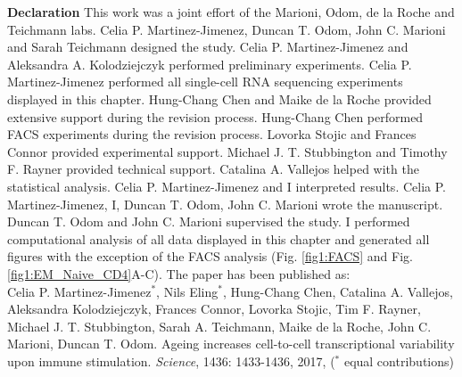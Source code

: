 \begin{Comment}
\textbf{Declaration} This work was a joint effort of the Marioni, Odom, de la Roche and Teichmann labs. Celia P. Martinez-Jimenez, Duncan T. Odom, John C. Marioni and Sarah Teichmann designed the study. Celia P. Martinez-Jimenez and Aleksandra A. Kolodziejczyk performed preliminary experiments. Celia P. Martinez-Jimenez performed all single-cell RNA sequencing experiments displayed in this chapter. Hung-Chang Chen and Maike de la Roche provided extensive support during the revision process. Hung-Chang Chen performed FACS experiments during the revision process. Lovorka Stojic and Frances Connor provided experimental support. Michael J. T. Stubbington and Timothy F. Rayner provided technical support. Catalina A. Vallejos helped with the statistical analysis. Celia P. Martinez-Jimenez and I interpreted results. Celia P. Martinez-Jimenez, I, Duncan T. Odom, John C. Marioni wrote the manuscript. Duncan T. Odom and John C. Marioni supervised the study. I performed computational analysis of all data displayed in this chapter and generated all figures with the exception of the FACS analysis (Fig. \ref{fig1:FACS} and Fig. \ref{fig1:EM_Naive_CD4}A-C). The paper has been published as:\\

Celia P. Martinez-Jimenez$^\ast$, Nils  Eling$^\ast$, Hung-Chang Chen, Catalina A. Vallejos, Aleksandra Kolodziejczyk, Frances Connor, Lovorka Stojic, Tim F. Rayner, Michael J. T. Stubbington, Sarah A. Teichmann, Maike de la Roche, John C. Marioni, Duncan T. Odom. Ageing increases cell-to-cell transcriptional variability upon immune stimulation. \emph{Science}, 1436: 1433-1436, 2017, ($^\ast$ equal contributions)
\end{Comment}

\newpage


\newpage

%
%
